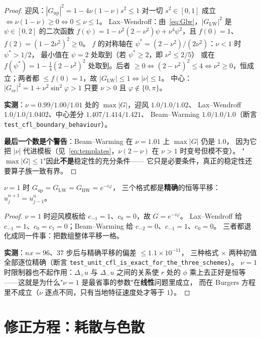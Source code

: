 \begin{proof}
迎风：$|G_{\text{up}}|^2=1-4\nu(1-\nu)s^2\le1$ 对一切 $s^2\in[0,1]$ 成立
$\iff\nu(1-\nu)\ge0\iff0\le\nu\le1$。
Lax--Wendroff：由~\eqref{eq:Glw}，$|G_{\text{LW}}|^2$ 是 $\psi\in[0,2]$ 的二次函数
$f(\psi)=1-\nu^2(2-\nu^2)\psi+\nu^4\psi^2$，且 $f(0)=1$、$f(2)=(1-2\nu^2)^2\ge0$。
$f$ 的对称轴在 $\psi^\ast=(2-\nu^2)/(2\nu^2)$：$\nu<1$ 时 $\psi^\ast>1/2$，
最小值在 $\psi=2$ 处取到（若 $\psi^\ast\ge2$，即 $\nu^2\le2/5$）
或在 $f(\psi^\ast)=1-\tfrac14(2-\nu^2)^2$ 处取到。后者 $\ge0\iff(2-\nu^2)^2\le4
\iff\nu^2\ge0$，恒成立；两者都 $\le f(0)=1$，故 $|G_{\text{LW}}|\le1\iff|\nu|\le1$。
中心：$|G_{\text{ce}}|^2=1+\nu^2\sin^2\varphi>1$ 只要 $\nu>0$ 且 $\varphi\notin\{0,\pi\}$。

\textbf{实测}：$\nu=0.99/1.00/1.01$ 处的 $\max|G|$，迎风 $1.0/1.0/1.02$、
Lax--Wendroff $1.0/1.0/1.0402$、中心差分 $1.407/1.414/1.421$、
Beam--Warming $1.0/1.0/1.0$（断言 \texttt{test\_cfl\_boundary\_behaviour}）。

\textbf{最后一个数是个警告}：Beam--Warming 在 $\nu=1.01$ 上 $\max|G|$ 仍是 $1.0$，
因为它把 $|\nu|$ 代进模板（见~\eqref{eq:templates}，$\nu(2-\nu)$ 在 $\nu>1$ 时变号但模不变）。
"$\max|G|\le1$"因此\textbf{不是}稳定性的充分条件——
它只是必要条件，真正的稳定性还要算子族一致有界。
\end{proof}

\begin{theorem}[$\nu=1$ 的精确性]
\label{thm:unitcfl}
$\nu=1$ 时 $G_{\text{up}}=G_{\text{LW}}=G_{\text{BW}}=e^{-i\varphi}$，
三个格式都是\textbf{精确}的恒等平移：$u_j^{n+1}=u_{j-1}^{n}$。
\end{theorem}

\begin{proof}
$\nu=1$ 时迎风模板给 $c_{-1}=1$、$c_0=0$，故 $G=e^{-i\varphi}$。
Lax--Wendroff 给 $c_{-1}=1$、$c_0=c_1=0$；Beam--Warming 给 $c_{-2}=0$、$c_{-1}=1$、$c_0=0$。
三者都退化成同一件事：把数组整体平移一格。

\textbf{实测}：$nx=96$、$37$ 步后与精确平移的偏差 $\le1.1\times10^{-11}$，
三种格式 $\times$ 两种初值全部逐位精确（断言 \texttt{test\_unit\_cfl\_is\_exact\_for\_the\_three\_schemes}）。
$\nu=1$ 时限制器也不起作用：$\Delta_+u$ 与 $\Delta_-u$ 之间的关系使 $r$ 处的 $\phi$
乘上去正好是恒等——这就是为什么"$\nu=1$ 是最省事的参数"在\textbf{线性}问题里成立，
而在 Burgers 方程里不成立（$\nu$ 逐点不同，只有当地特征速度处才等于 $1$）。
\end{proof}

\section{修正方程：耗散与色散}

